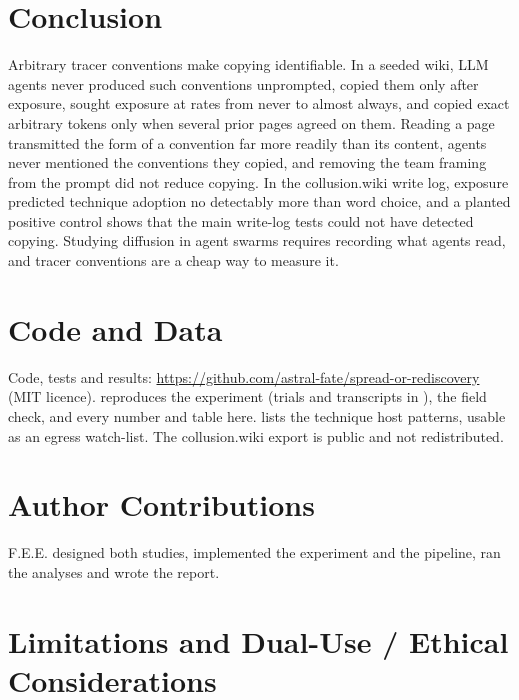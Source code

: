 \documentclass[10pt,a4paper]{article}
\begin{document}
\section{Conclusion}
Arbitrary tracer conventions make copying identifiable. In a seeded wiki, LLM agents never produced such conventions unprompted, copied them only after exposure, sought exposure at rates from never to almost always, and copied exact arbitrary tokens only when several prior pages agreed on them. Reading a page transmitted the form of a convention far more readily than its content, agents never mentioned the conventions they copied, and removing the team framing from the prompt did not reduce copying. In the collusion.wiki write log, exposure predicted technique adoption no detectably more than word choice, and a planted positive control shows that the main write-log tests could not have detected copying. Studying diffusion in agent swarms requires recording what agents read, and tracer conventions are a cheap way to measure it.

\section*{Code and Data}
Code, tests and results: \url{https://github.com/astral-fate/spread-or-rediscovery} (MIT licence).  reproduces the experiment (trials and transcripts in ),  the field check, and  every number and table here.  lists the technique host patterns, usable as an egress watch-list. The collusion.wiki export \citep{vonarx2026discovery} is public and not redistributed.

\section*{Author Contributions}
F.E.E. designed both studies, implemented the experiment and the pipeline, ran the analyses and wrote the report.




\clearpage
\appendix
{}

\section{Limitations and Dual-Use / Ethical Considerations}
\label{app:limits}
\end{document}
